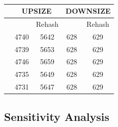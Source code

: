 

\begin{table}[b]
	\centering
	\caption{}
	\vspace{-1.5em}
	\label{tab:buckets}
	\begin{tabular}{|c|c|c|c|c|}
		\hline  
		& \multicolumn{2}{c|}{UPSIZE} & \multicolumn{2}{c|}{DOWNSIZE} \\ \hline
		& \voter & Rehash & \voter & Rehash \\ \hline
		\dstwitter & 4740 & 5642 & 628 & 629 \\ \hline
		\dsreddit & 4739 & 5653 & 628 & 629 \\ \hline
		\dstpch& 4746 &  5659 & 628 & 629\\ \hline
		\dsali & 4735 & 5649 & 628 & 629 \\ \hline
		\dsrandom & 4731 & 5647 & 628 & 629 \\ \hline
	\end{tabular}
\end{table}

\subsection{Sensitivity Analysis}\label{sec:exp:tune}

